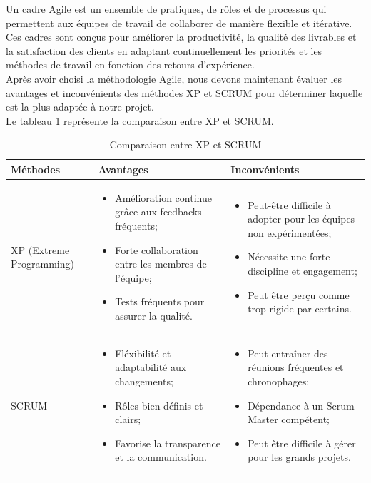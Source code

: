\documentclass[12pt]{report}
\begin{document}
				\hspace{15pt} Un cadre Agile est un ensemble de pratiques, de rôles et de processus qui permettent aux équipes de travail de collaborer de manière flexible et itérative. Ces cadres sont conçus pour améliorer la productivité, la qualité des livrables et la satisfaction des clients en adaptant continuellement les priorités et les méthodes de travail en fonction des retours d'expérience.\\

				Après avoir choisi la méthodologie Agile, nous devons maintenant évaluer les avantages et inconvénients des méthodes XP et SCRUM pour déterminer laquelle est la plus adaptée à notre projet.\\

				
				Le tableau \ref{tab:XPvsSCRUM} représente la comparaison entre XP et SCRUM.


				\begin{longtable}{|p{3cm}|p{5.5cm}|p{5.5cm}|} 
						\caption{Comparaison entre XP et SCRUM} 
						\label{tab:XPvsSCRUM}\\ 
						\hline 
						\textbf{Méthodes} & \textbf{Avantages} & \textbf{Inconvénients}\\ 
						\hline 
						\endfirsthead 	
						\endhead
						XP (Extreme Programming) &
						\begin{itemize}
							\item Amélioration continue grâce aux feedbacks fréquents;
							\item Forte collaboration entre les membres de l'équipe;
							\item Tests fréquents pour assurer la qualité.
						\end{itemize}
						&
						\begin{itemize}
							\item Peut-être difficile à adopter pour les équipes non expérimentées;
							\item Nécessite une forte discipline et engagement;
							\item Peut être perçu comme trop rigide par certains.
						\end{itemize}\\						
						\hline
						SCRUM &
						\begin{itemize}
							\item Fléxibilité et adaptabilité aux changements;
							\item Rôles bien définis et clairs;
							\item Favorise la transparence et la communication.
						\end{itemize} &
						\begin{itemize}
							\item Peut entraîner des réunions fréquentes et chronophages;
							\item Dépendance à un Scrum Master compétent;
							\item Peut être difficile à gérer pour les grands projets.
						\end{itemize} \\
						\hline
				    \end{longtable}
				
\end{document}
